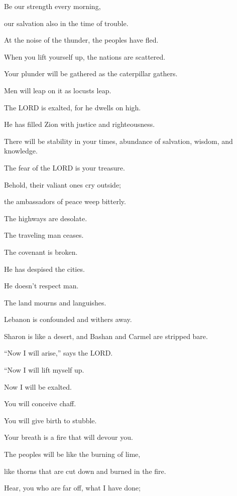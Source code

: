 Be our strength every morning,

our salvation also in the time of trouble.

\myverse{}At the noise of the thunder, the peoples have fled.

When you lift yourself up, the nations are scattered.

\myverse{}Your plunder will be gathered as the caterpillar gathers.

Men will leap on it as locusts leap.

\myverse{}The LORD is exalted, for he dwells on high.

He has filled Zion with justice and righteousness.

\myverse{}There will be stability in your times, abundance of salvation,
wisdom, and knowledge.

The fear of the LORD is your treasure.


\vspace{\baselineskip} \myverse{}Behold, their valiant ones cry outside;

the ambassadors of peace weep bitterly.

\myverse{}The highways are desolate.

The traveling man ceases.

The covenant is broken.

He has despised the cities.

He doesn’t respect man.

\myverse{}The land mourns and languishes.

Lebanon is confounded and withers away.

Sharon is like a desert, and Bashan and Carmel are stripped bare.

\myverse{}“Now I will arise,” says the LORD.

“Now I will lift myself up.

Now I will be exalted.

\myverse{}You will conceive chaff.

You will give birth to stubble.

Your breath is a fire that will devour you.

\myverse{}The peoples will be like the burning of lime,

like thorns that are cut down and burned in the fire.


\vspace{\baselineskip} \myverse{}Hear, you who are far off, what I have done;

